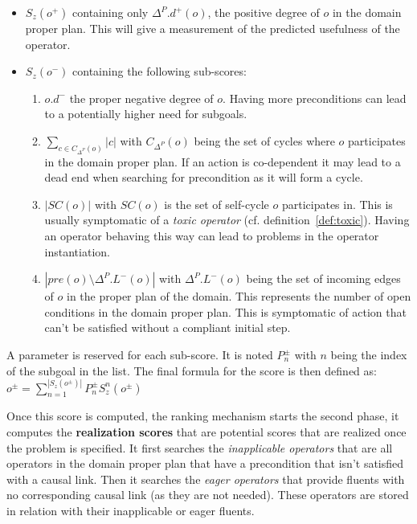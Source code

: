 \begin{itemize}
\tightlist
\item
  \(S_z(o^+)\) containing only \(\Delta^P.d^+(o)\), the positive degree
  of \(o\) in the domain proper plan. This will give a measurement of
  the predicted usefulness of the operator.
\item
  \(S_z(o^-)\) containing the following sub-scores:

  \begin{enumerate}
  \def\labelenumi{\arabic{enumi}.}
  \tightlist
  \item
    \(o.d^-\) the proper negative degree of \(o\). Having more
    preconditions can lead to a potentially higher need for subgoals.
  \item
    \(\sum_{c \in C_{\Delta^P}(o)}|c|\) with \(C_{\Delta^P}(o)\) being
    the set of cycles where \(o\) participates in the domain proper
    plan. If an action is co-dependent it may lead to a dead end when
    searching for precondition as it will form a cycle.
  \item
    \(|SC(o)|\) with \(SC(o)\) is the set of self-cycle \(o\)
    participates in. This is usually symptomatic of a \emph{toxic
    operator} (cf. definition~\ref{def:toxic}). Having an operator
    behaving this way can lead to problems in the operator
    instantiation.
  \item
    \(\left|pre(o) \setminus \Delta^P.L^-(o)\right|\) with
    \(\Delta^P.L^-(o)\) being the set of incoming edges of \(o\) in the
    proper plan of the domain. This represents the number of open
    conditions in the domain proper plan. This is symptomatic of action
    that can't be satisfied without a compliant initial step.
  \end{enumerate}
\end{itemize}

A parameter is reserved for each sub-score. It is noted \(P_n^\pm\) with
\(n\) being the index of the subgoal in the list. The final formula for
the score is then defined as:
\(o^\pm = \sum_{n=1}^{|S_z(o^\pm)|}{P_n^\pm S_z^n(o^\pm)}\)

Once this score is computed, the ranking mechanism starts the second
phase, it computes the \textbf{realization scores} that are potential
scores that are realized once the problem is specified. It first
searches the \emph{inapplicable operators} that are all operators in the
domain proper plan that have a precondition that isn't satisfied with a
causal link. Then it searches the \emph{eager operators} that provide
fluents with no corresponding causal link (as they are not needed).
These operators are stored in relation with their inapplicable or eager
fluents.

